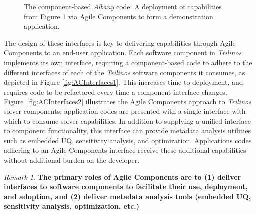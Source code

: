 \documentclass[pdf,ps2pdf,12pt,report]{SANDreport}
\theoremstyle{plain}
\theoremstyle{definition}
\theoremstyle{remark}
\newtheorem{rem}{Remark}[section]
\numberwithin{equation}{section}
\begin{document}
\begin{figure}[htbp]
\begin{center}
\begin{minipage}[b]{0.8\linewidth}
    \caption{The component-based \emph{Albany} code: A deployment of capabilities from Figure 1 via Agile Components to form a demonstration application.}
    \label{fig:ACAlbany}
  \end{minipage}
  \end{center}
\end{figure}
The design of these interfaces is key to delivering capabilities through Agile Components to an end-user application. Each software component in \emph{Trilinos} implements its own interface, requiring a component-based code to adhere to the different interfaces of each of the \emph{Trilinos} software components it consumes, as depicted in Figure \ref{fig:ACInterfaces1}.  This increases time to deployment, and requires code to be refactored every time a component interface changes.   Figure~\ref{fig:ACInterfaces2} illustrates the Agile Components approach to \emph{Trilinos} solver components; application codes are presented with a single interface with which to consume solver capabilities.  In addition to supplying a unified interface to component functionality, this interface can provide metadata analysis utilities such as embedded UQ, sensitivity analysis, and optimization.  Applications codes adhering to an Agile Components interface receive these additional capabilities without additional burden on the developer.

\begin{rem}
\textbf{The primary roles of Agile Components are to (1) deliver interfaces to software components to facilitate their use, deployment, and adoption, and (2) deliver metadata analysis tools (embedded UQ, sensitivity analysis, optimization, etc.)}
\end{rem}
\end{document}
